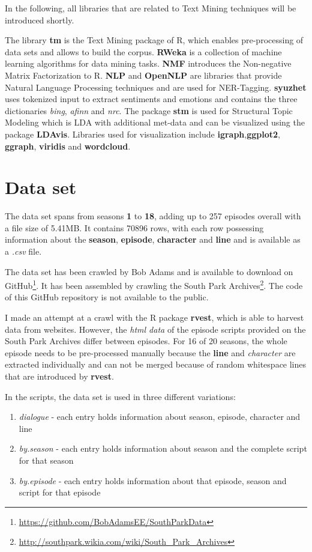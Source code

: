 \documentclass[10pt,a4paper]{article}
\begin{document}
	In the following, all libraries that are related to Text Mining techniques will be introduced shortly.
	
	The library \textbf{tm} is the Text Mining package of R, which enables pre-processing of data sets and allows to build the corpus. \textbf{RWeka} is a collection of machine learning algorithms for data mining tasks. \textbf{NMF} introduces the Non-negative Matrix Factorization to R.
	\textbf{NLP} and \textbf{OpenNLP} are libraries that provide Natural Language Processing techniques and are used for NER-Tagging. \textbf{syuzhet} uses tokenized input to extract sentiments and emotions and contains the three dictionaries \textit{bing}, \textit{afinn} and \textit{nrc}.
	The package \textbf{stm} is used for Structural Topic Modeling  which is LDA with additional met-data and can be visualized using the package \textbf{LDAvis}.
	Libraries used for visualization include \textbf{igraph},\textbf{ggplot2}, \textbf{ggraph}, \textbf{viridis} and \textbf{wordcloud}.
	
	\section{Data set}	
	The data set spans from seasons \textbf{1} to \textbf{18}, adding up to 257 episodes overall with a file size of 5.41MB. It contains 70896 rows, with each row possessing information about the \textbf{season}, \textbf{episode}, \textbf{character} and \textbf{line} and is available as a \textit{.csv} file.
	
	The data set has been crawled by Bob Adams and is available to download on GitHub\footnote{\url{https://github.com/BobAdamsEE/SouthParkData}}. It has been assembled by crawling the South Park Archives\footnote{\url{http://southpark.wikia.com/wiki/South_Park_Archives}}. The code of this GitHub repository is not available to the public.
	
	 I made an attempt at a crawl with the R package \textbf{rvest}, which is able to harvest data from websites.  However, the \textit{html data} of the episode scripts provided on the South Park Archives differ between episodes. For 16 of 20 seasons, the whole episode needs to be pre-processed manually because the \textbf{line} and \textit{character} are extracted individually and can not be merged because of random whitespace lines that are introduced by \textbf{rvest}.
	 
	 In the scripts, the data set is used in three different variations:
	 \begin{enumerate}
	 \item \textit{dialogue} - each entry holds information about season, episode, character and line
	 \item \textit{by.season} - each entry holds information about season and the complete script for that season
	 \item \textit{by.episode} - each entry holds information about that episode, season and script for that episode
	 \end{enumerate}
	 
\end{document}
